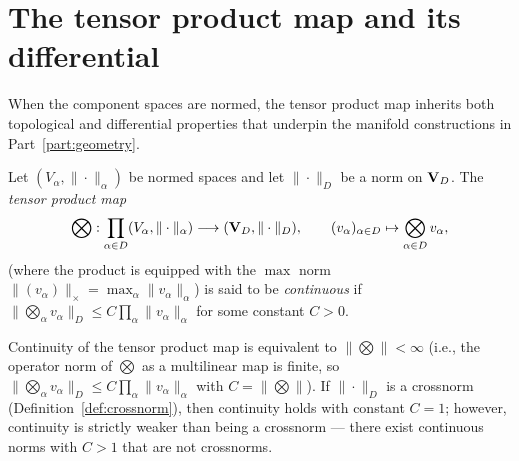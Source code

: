 \section{The tensor product map and its differential}
\label{sec:algtensor:tensmap}

When the component spaces are normed, the tensor product map inherits
both topological and differential properties that underpin the manifold
constructions in Part~\ref{part:geometry}.

\begin{definition}
\label{def:tensor_product_continuous}
Let $(V_\alpha, \|\cdot\|_\alpha)$ be normed spaces and let $\|\cdot\|_D$
be a norm on $\mathbf{V}_D$. The \emph{tensor product map}
\begin{equation}
\label{eq:tensor_product_normed}
    \bigotimes :
    \prod_{\alpha \in D}(V_\alpha, \|\cdot\|_\alpha) \longrightarrow
    (\mathbf{V}_D, \|\cdot\|_D),
    \qquad
    (v_\alpha)_{\alpha \in D} \mapsto \bigotimes_{\alpha \in D} v_\alpha,
\end{equation}
(where the product is equipped with the $\max$ norm
$\|(v_\alpha)\|_\times = \max_\alpha \|v_\alpha\|_\alpha$) is said to be
\emph{continuous} if $\|\bigotimes_\alpha v_\alpha\|_D \leq C \prod_\alpha
\|v_\alpha\|_\alpha$ for some constant $C > 0$.
\end{definition}

Continuity of the tensor product map is equivalent to
$\|\bigotimes\| < \infty$ (i.e., the operator norm of $\bigotimes$
as a multilinear map is finite, so $\|\bigotimes_\alpha v_\alpha\|_D
\leq C \prod_\alpha \|v_\alpha\|_\alpha$ with $C = \|\bigotimes\|$).
If $\|\cdot\|_D$ is a crossnorm (Definition~\ref{def:crossnorm}), then
continuity holds with constant $C = 1$; however, continuity is strictly
weaker than being a crossnorm — there exist continuous norms with $C > 1$
that are not crossnorms.

